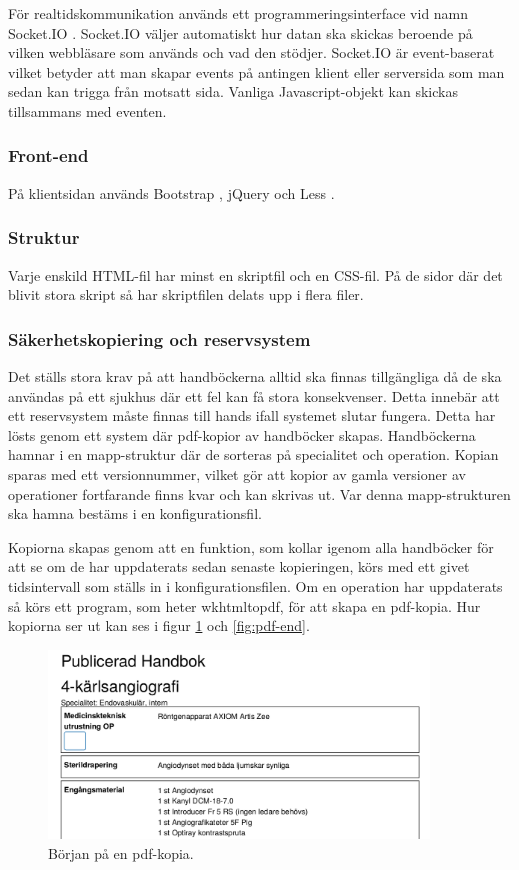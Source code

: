 För realtidskommunikation används ett programmeringsinterface vid namn Socket.IO \cite{socketio}.
Socket.IO väljer automatiskt hur datan ska skickas beroende på vilken webbläsare som används och vad den stödjer.
Socket.IO är event-baserat vilket betyder att man skapar events på antingen klient eller serversida som man sedan kan trigga från motsatt sida.
Vanliga Javascript-objekt kan skickas tillsammans med eventen.

\subsubsection{Front-end}
På klientsidan används Bootstrap \cite{bootstrap}, jQuery \cite{jquery} och Less \cite{less}.

\subsubsection{Struktur}
Varje enskild HTML-fil har minst en skriptfil och en CSS-fil. På de sidor där det blivit stora skript så har skriptfilen delats upp i flera filer.

\subsubsection{Säkerhetskopiering och reservsystem}
Det ställs stora krav på att handböckerna alltid ska finnas tillgängliga då de ska användas på ett sjukhus där ett fel kan få stora konsekvenser. Detta innebär att ett reservsystem måste finnas till hands ifall systemet slutar fungera. Detta har lösts genom ett system där pdf-kopior av handböcker skapas. Handböckerna hamnar i en mapp-struktur där de sorteras på specialitet och operation. Kopian sparas med ett versionnummer, vilket gör att kopior av gamla versioner av operationer fortfarande finns kvar och kan skrivas ut. Var denna mapp-strukturen ska hamna bestäms i en konfigurationsfil.

Kopiorna skapas genom att en funktion, som kollar igenom alla handböcker för att se om de har uppdaterats sedan senaste kopieringen, körs med ett givet tidsintervall som ställs in i konfigurationsfilen. Om en operation har uppdaterats så körs ett program, som heter wkhtmltopdf, för att skapa en pdf-kopia. Hur kopiorna ser ut kan ses i figur \ref{fig:pdf-start} och \ref{fig:pdf-end}.

\begin{figure}[H]
  \centering
  \includegraphics[width=0.9\textwidth]{images/pdf-start.png}
  \caption{Början på en pdf-kopia.}
  \label{fig:pdf-start}
\end{figure}

